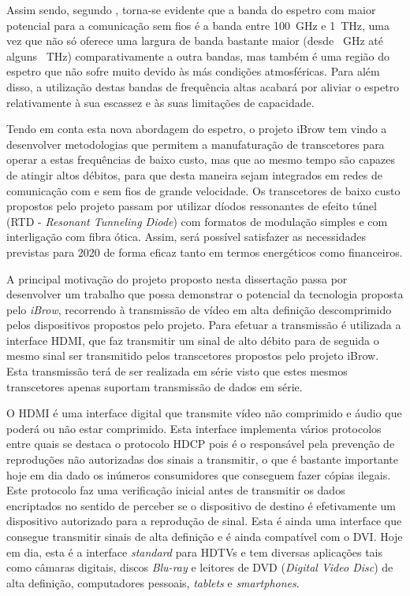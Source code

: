 Assim sendo, segundo \cite{R005}, torna-se evidente que a banda do espetro com maior potencial para a comunicação sem fios é a banda entre \SI{100}{\giga\hertz} e \SI{1}{\tera\hertz}, uma vez que não só oferece uma largura de banda bastante maior (desde \SI{}{\giga\hertz} até alguns  \SI{}{\tera\hertz}) comparativamente a outra bandas, mas também é uma região do espetro que não sofre muito devido às más condições atmosféricas. Para além disso, a utilização destas bandas de frequência altas acabará por aliviar o espetro relativamente à sua escassez e às suas limitações de capacidade. 

Tendo em conta esta nova abordagem do espetro, o projeto iBrow tem vindo a desenvolver metodologias que permitem a manufaturação de transcetores para operar a estas frequências de baixo custo, mas que ao mesmo tempo são capazes de atingir altos débitos, para que desta maneira sejam integrados em redes de comunicação com e sem fios de grande velocidade. Os transcetores de baixo custo propostos pelo projeto passam por utilizar díodos ressonantes de efeito túnel (RTD - \textit{Resonant Tunneling Diode}) com formatos de modulação simples e com interligação com fibra ótica. Assim, será possível satisfazer as necessidades previstas para 2020 de forma eficaz tanto em termos energéticos como financeiros.


A principal motivação do projeto proposto nesta dissertação passa por desenvolver um trabalho que possa demonstrar o potencial da tecnologia proposta pelo \textit{iBrow}, recorrendo à transmissão de vídeo em alta definição descomprimido pelos dispositivos propostos pelo projeto. Para efetuar a transmissão é utilizada a interface HDMI, que faz transmitir um sinal de alto débito para de seguida o mesmo sinal ser transmitido pelos transcetores propostos pelo projeto iBrow. Esta transmissão terá de ser realizada em série visto que estes mesmos transcetores apenas suportam transmissão de dados em série.

O HDMI é uma interface digital que transmite vídeo não comprimido e áudio que poderá ou não estar comprimido. Esta interface implementa vários protocolos entre quais se destaca o protocolo HDCP pois é o responsável pela prevenção de reproduções não autorizadas dos sinais a transmitir, o que é bastante importante hoje em dia dado os inúmeros consumidores que conseguem fazer cópias ilegais. Este protocolo faz uma verificação inicial antes de transmitir os dados encriptados no sentido de perceber se o dispositivo de destino é efetivamente um dispositivo autorizado para a reprodução de sinal. Esta é ainda uma interface que consegue transmitir sinais de alta definição e é ainda compatível com o DVI. Hoje em dia, esta é a interface \textit{standard} para HDTVs e tem diversas aplicações tais como câmaras digitais, discos \textit{Blu-ray} e leitores de DVD (\textit{Digital Video Disc}) de alta definição, computadores pessoais, \textit{tablets} e \textit{smartphones}.

